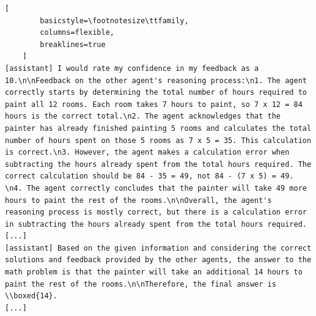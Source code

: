 \begin{itemize}
\begin{lstlisting}[
        basicstyle=\footnotesize\ttfamily,
        columns=flexible,
        breaklines=true
    ]
[assistant] I would rate my confidence in my feedback as a 10.\n\nFeedback on the other agent's reasoning process:\n1. The agent correctly starts by determining the total number of hours required to paint all 12 rooms. Each room takes 7 hours to paint, so 7 x 12 = 84 hours is the correct total.\n2. The agent acknowledges that the painter has already finished painting 5 rooms and calculates the total number of hours spent on those 5 rooms as 7 x 5 = 35. This calculation is correct.\n3. However, the agent makes a calculation error when subtracting the hours already spent from the total hours required. The correct calculation should be 84 - 35 = 49, not 84 - (7 x 5) = 49. \n4. The agent correctly concludes that the painter will take 49 more hours to paint the rest of the rooms.\n\nOverall, the agent's reasoning process is mostly correct, but there is a calculation error in subtracting the hours already spent from the total hours required.
[...]
[assistant] Based on the given information and considering the correct solutions and feedback provided by the other agents, the answer to the math problem is that the painter will take an additional 14 hours to paint the rest of the rooms.\n\nTherefore, the final answer is \\boxed{14}.
[...]
    \end{lstlisting}
\end{itemize}



